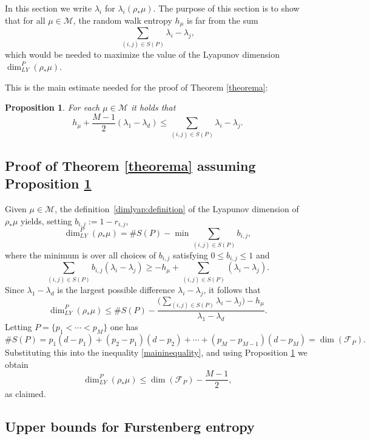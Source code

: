 \documentclass[10pt]{amsart}
\newtheorem{proposition}[theorem]{Proposition}
\newcommand{\F}{\mathcal{F}}
\newcommand{\M}{\mathcal M}
\begin{document}
In this section we write \(\lambda_i\) for \(\lambda_i(\rho_*\mu)\). The purpose of this section is to show that for all \(\mu \in \M\), the random walk entropy \(h_\mu\) is far from the sum
\[
\sum_{(i,j) \in S(P)}\lambda_i - \lambda_j,
\]
which would be needed to maximize the value of the Lyapunov dimension \(\dim_{LY}^P(\rho_*\mu)\).

This is the main estimate needed for the proof of Theorem \ref{theorema}:
\begin{proposition}\label{mainlemma}
For each \(\mu \in \M\) it holds that
\[
h_\mu + \frac{M- 1}{2}\left(\lambda_1 - \lambda_d\right) \le \sum_{(i,j) \in S(P)}\lambda_i - \lambda_j.
\]
\end{proposition}

\subsection{Proof of Theorem \ref{theorema} assuming Proposition \ref{mainlemma}}

Given \(\mu \in \M\), the definition~\eqref{dimlyap:definition} of the Lyapunov dimension of \(\rho_\ast \mu \) yields, setting \(b_{i,j} := 1-r_{i,j}\),
\begin{equation}\label{lyapunovdimensionequation}
\dim_{LY}^P(\rho_*\mu) = \# S(P) -\min \sum_{(i,j) \in S(P)} b_{i,j},
\end{equation}
where the minimum is over all choices of \(b_{i,j}\) satisfying \(0 \le b_{i,j} \le 1\) and
\[
\sum_{(i,j) \in S(P)}b_{i,j} (\lambda_i - \lambda_j)\geq - h_\mu + \sum_{(i,j) \in S(P)}(\lambda_i - \lambda_j).
\]
Since \(\lambda_1 - \lambda_d\) is the largest possible difference \(\lambda_i -\lambda_j\), it follows that
\begin{equation}\label{maininequality}
\dim_{LY}^P(\rho_*\mu) \le \# S(P) - \frac{\bigl(\sum_{(i,j) \in S(P)}\lambda_i - \lambda_j\bigr) - h_\mu}{\lambda_1-\lambda_d}.\end{equation}
Letting \(P = \lbrace p_1 < \cdots < p_{M} \rbrace\) one has
\[
\# S(P) = p_1(d-p_1) + (p_2-p_1)(d-p_2) + \cdots + (p_{M} - p_{M-1})(d-p_{M}) = \dim(\F_{P}).
\]
Substituting this into the inequality \eqref{maininequality}, and using Proposition \ref{mainlemma} we obtain
\[
\dim_{LY}^P(\rho_*\mu) \le \dim(\F_{P}) - \frac{M - 1}{2},
\]
as claimed.

\subsection{Upper bounds for Furstenberg entropy}
\end{document}
